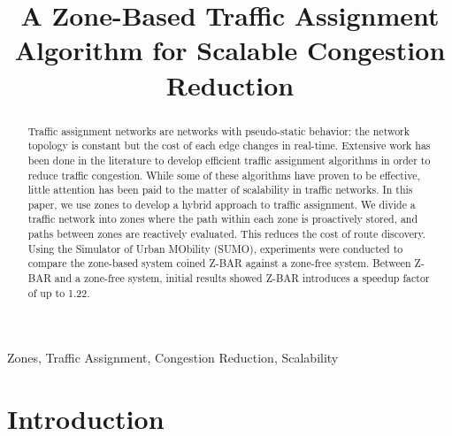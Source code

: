\documentclass[conference]{IEEEtran}
\begin{document}
\raggedbottom

\title{A Zone-Based Traffic Assignment Algorithm for Scalable Congestion Reduction}


\author{
}

\maketitle

\begin{abstract}
Traffic assignment networks are networks with pseudo-static behavior: the network topology is constant but the cost of each edge changes in real-time. Extensive work has been done in the literature to develop efficient traffic assignment algorithms in order to reduce traffic congestion. While some of these algorithms have proven to be effective, little attention has been paid to the matter of scalability in traffic networks. In this paper, we use zones to develop a hybrid approach to traffic assignment. We divide a traffic network into zones where the path within each zone is proactively stored, and paths between zones are reactively evaluated. This reduces the cost of route discovery. Using the Simulator of Urban MObility (SUMO), experiments were conducted to compare the zone-based system coined Z-BAR against a zone-free system. Between Z-BAR and a zone-free system, initial results showed Z-BAR introduces a speedup factor of up to 1.22.
\end{abstract}

\begin{IEEEkeywords}
Zones, Traffic Assignment, Congestion Reduction, Scalability
\end{IEEEkeywords}

\IEEEpeerreviewmaketitle

\section{Introduction}
\end{document}

